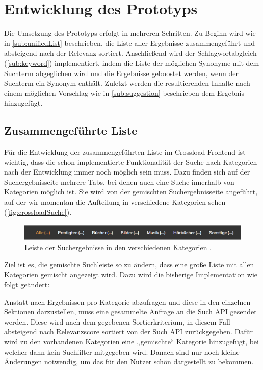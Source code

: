\chapter{Entwicklung des Prototyps}
\label{ch:development}

Die Umsetzung des Prototyps erfolgt in mehreren Schritten.
Zu Beginn wird wie in \ref{sub:unifiedList} beschrieben, die Liste aller Ergebnisse zusammengeführt und absteigend nach der Relevanz sortiert.
Anschließend wird der Schlagwortabgleich (\ref{sub:keyword}) implementiert, indem die Liste der möglichen Synonyme mit dem Suchterm abgeglichen wird und die Ergebnisse geboostet werden, wenn der Suchterm ein Synonym enthält.
Zuletzt werden die resultierenden Inhalte nach einem möglichen Vorschlag wie in \ref{sub:suggestion} beschrieben dem Ergebnis hinzugefügt.

\section{Zusammengeführte Liste}
\label{sec:devUnifiedList}

Für die Entwicklung der zusammengeführten Liste im Crossload Frontend ist wichtig, dass die schon implementierte Funktionalität der Suche nach Kategorien nach der Entwicklung immer noch möglich sein muss.
Dazu finden sich auf der Suchergebnisseite mehrere Tabs, bei denen auch eine Suche innerhalb von Kategorien möglich ist.
Sie wird von der gemischten Suchergebnisseite angeführt, auf der wir momentan die Aufteilung in verschiedene Kategorien sehen (\ref{fig:crossloadSuche}).

\begin{figure}[h]
  \begin{centering}
    \includegraphics[width=\textwidth]{figures/development/kategorienLeiste.png}
    \caption{Leiste der Suchergebnisse in den verschiedenen Kategorien \cite{pfleiderer2022}.}
    \label{fig:kategorienLeiste}
  \end{centering}
\end{figure}

Ziel ist es, die gemischte Suchleiste so zu ändern, dass eine große Liste mit allen Kategorien gemischt angezeigt wird.
Dazu wird die bisherige Implementation wie folgt geändert:

Anstatt nach Ergebnissen pro Kategorie abzufragen und diese in den einzelnen Sektionen darzustellen, muss eine gesammelte Anfrage an die Such API gesendet werden.
Diese wird nach dem gegebenen Sortierkriterium, in diesem Fall absteigend nach Relevanzscore sortiert von der Such API zurückgegeben.
Dafür wird zu den vorhandenen Kategorien eine „gemischte“ Kategorie hinzugefügt, bei welcher dann kein Suchfilter mitgegeben wird.
Danach sind nur noch kleine Änderungen notwendig, um das für den Nutzer schön dargestellt zu bekommen.


